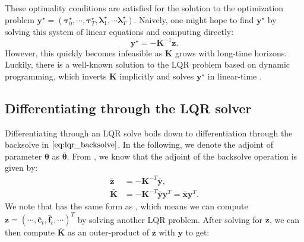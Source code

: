 \documentclass[a4paper,11pt]{article}
\renewcommand\b\bm
\begin{document}
%
These optimality conditions are satisfied for the solution to the optimization problem $\b{y}^\star = (\b{\tau}^\star_0, \cdots, \b{\tau}^\star_T, \b{\lambda}_{1}^\star, \cdots \b{\lambda}_T^\star)$.
Naively, one might hope to find $\b{y}^\star$ by solving this system of linear equations and computing directly:
%
\begin{equation}
    \label{eq:lqr_backsolve}
    \b{y}^\star = -\b{K}^{-1}\b{z}.
\end{equation}
%
However, this quickly becomes infeasible as $\b{K}$ grows with long-time horizons.
Luckily, there is a well-known solution to the LQR problem based on dynamic programming, which inverts $\b{K}$ implicitly and solves $\b{y}^\star$ in linear-time \citep{Anderson2007}.

\subsection{Differentiating through the LQR solver}
Differentiating through an LQR solve boils down to differentiation through the backsolve in $\Cref{eq:lqr_backsolve}$.
In the following, we denote the adjoint of parameter $\b{\theta}$ as $\bar{\b{\theta}}$.
%
From \citep{Giles2008}, we know that the adjoint of the backsolve operation is given by:
%
\begin{align}
    \label{eq:xbar}
    \bar{\b{z}} & = - \b{K}^{-T} \bar{\b{y}},                             \\
    \label{eq:kbar}
    \bar{\b{K}} & = -\b{K}^{-T} \bar{\b{y}} \b{y}^T = \bar{\b{x}}\b{y}^T.
\end{align}
%
We note that  has the same form as , which means we can compute $\bar{\b{z}} = (\cdots, \bar{\b{c}}_t, \bar{\b{f}}_t, \cdots)^T$ by solving another LQR problem.
After solving for $\bar{\b{z}}$, we can then compute $\bar{\b{K}}$ as an outer-product of  $\bar{\b{z}}$ with $\b{y}$ to get:
%
\end{document}
